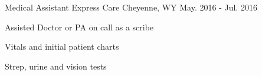 \begin{cventries}
  \cventry
    {Medical Assistant} %
    {Express Care} %
    {Cheyenne, WY} %
    {May. 2016 - Jul. 2016} %
    {
      \begin{cvitems} %
        \item {Assisted Doctor or PA on call as a scribe}
        \item {Vitals and initial patient charts}
        \item {Strep, urine and vision tests}
      \end{cvitems}
    }




\end{cventries}
